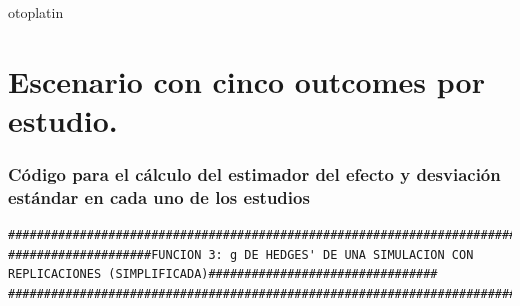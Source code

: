 otoplatin\documentclass[a4paper,openright,12pt]{report}
\begin{document}
\section{Escenario con cinco outcomes por estudio.}
\subsubsection{Código para el cálculo del estimador del efecto y desviación estándar en cada uno de los estudios}
{\tiny
\begin{verbatim}
##############################################################################################################################
####################FUNCION 3: g DE HEDGES' DE UNA SIMULACION CON REPLICACIONES (SIMPLIFICADA)################################
##############################################################################################################################


\end{verbatim}}
\end{document}
